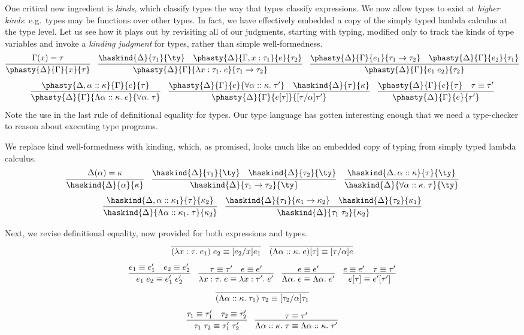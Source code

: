 \documentclass{amsbook}
\theoremstyle{definition}
\theoremstyle{remark}
\numberwithin{section}{chapter}
\numberwithin{equation}{chapter}
\begin{document}
One critical new ingredient is \emph{kinds}, which classify types the way that types classify expressions.
We now allow types to exist at \emph{higher kinds}: e.g.\ types may be functions over other types.
In fact, we have effectively embedded a copy of the simply typed lambda calculus at the type level.
Let us see how it plays out by revisiting all of our judgments, starting with typing, modified only to track the kinds of type variables and invoke a \emph{kinding judgment} for types, rather than simple well-formedness.
$$\infer{\phasty{\Delta}{\Gamma}{x}{\tau}}{
  \msel{\Gamma}{x} = \tau
}
\quad \infer{\phasty{\Delta}{\Gamma}{\lambda x : \tau_1. \; e}{\tau_1 \to \tau_2}}{
  \haskind{\Delta}{\tau_1}{\ty}
  & \phasty{\Delta}{\Gamma, x : \tau_1}{e}{\tau_2}
}
\quad \infer{\phasty{\Delta}{\Gamma}{e_1 \; e_2}{\tau_2}}{
  \phasty{\Delta}{\Gamma}{e_1}{\tau_1 \to \tau_2}
  & \phasty{\Delta}{\Gamma}{e_2}{\tau_1}
}$$
$$\infer{\phasty{\Delta}{\Gamma}{\Lambda \alpha :: \kappa. \; e}{\forall \alpha. \; \tau}}{
  \phasty{\Delta, \alpha :: \kappa}{\Gamma}{e}{\tau}
}
\quad \infer{\phasty{\Delta}{\Gamma}{e[\tau]}{\subst{\tau'}{\alpha}{\tau}}}{
  \phasty{\Delta}{\Gamma}{e}{\forall \alpha :: \kappa. \; \tau'}
  & \haskind{\Delta}{\tau}{\kappa}
}
\quad \infer{\phasty{\Delta}{\Gamma}{e}{\tau'}}{
  \phasty{\Delta}{\Gamma}{e}{\tau}
  & \tau \equiv \tau'
}$$
Note the use in the last rule of definitional equality for types.
Our type language has gotten interesting enough that we need a type-checker to reason about executing type programs.

We replace kind well-formedness with kinding, which, as promised, looks much like an embedded copy of typing from simply typed lambda calculus.
$$\infer{\haskind{\Delta}{\alpha}{\kappa}}{
  \Delta(\alpha) = \kappa
}
\quad \infer{\haskind{\Delta}{\tau_1 \to \tau_2}{\ty}}{
  \haskind{\Delta}{\tau_1}{\ty}
  & \haskind{\Delta}{\tau_2}{\ty}
}
\quad \infer{\haskind{\Delta}{\forall \alpha :: \kappa. \; \tau}{\ty}}{
  \haskind{\Delta, \alpha :: \kappa}{\tau}{\ty}
}$$
$$\infer{\haskind{\Delta}{\Lambda \alpha :: \kappa_1. \; \tau}{\kappa_2}}{
  \haskind{\Delta, \alpha :: \kappa_1}{\tau}{\kappa_2}
}
\quad \infer{\haskind{\Delta}{\tau_1 \; \tau_2}{\kappa_2}}{
  \haskind{\Delta}{\tau_1}{\kappa_1 \to \kappa_2}
  & \haskind{\Delta}{\tau_2}{\kappa_1}
}$$

Next, we revise definitional equality, now provided for both expressions and types.
$$\infer{(\lambda x : \tau. \; e_1) \; e_2 \equiv \subst{e_1}{x}{e_2}}{}
\quad \infer{(\Lambda \alpha :: \kappa. \; e)[\tau] \equiv \subst{e}{\alpha}{\tau}}{}$$
$$\infer{e_1 \; e_2 \equiv e'_1 \; e'_2}{
  e_1 \equiv e'_1
  & e_2 \equiv e'_2
}
\quad \infer{\lambda x : \tau. \; e \equiv \lambda x : \tau'. \; e'}{
  \tau \equiv \tau'
  & e \equiv e'
}
\quad \infer{\Lambda \alpha. \; e \equiv \Lambda \alpha. \; e'}{
  e \equiv e'
}
\quad \infer{e[\tau] \equiv e'[\tau']}{
  e \equiv e'
  & \tau \equiv \tau'
}$$
$$\infer{(\Lambda \alpha :: \kappa. \; \tau_1) \; \tau_2 \equiv \subst{\tau_1}{\alpha}{\tau_2}}{}$$
$$\infer{\tau_1 \; \tau_2 \equiv \tau'_1 \; \tau'_2}{
  \tau_1 \equiv \tau'_1
  & \tau_2 \equiv \tau'_2
}
\quad \infer{\Lambda \alpha :: \kappa. \; \tau \equiv \Lambda \alpha :: \kappa. \; \tau'}{
  \tau \equiv \tau'
}$$
\end{document}
